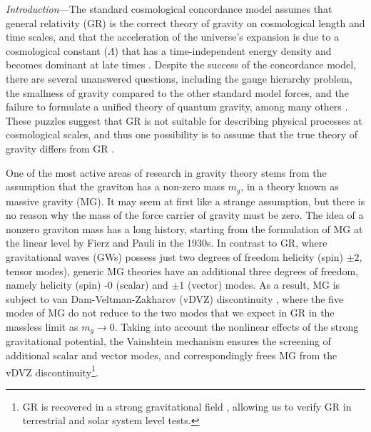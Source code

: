 \documentclass[prd,twocolumn,aps,psfig,nofootinbib,nobibnotes,superscriptaddress,preprintnumbers,times]{revtex4-2}
\begin{document}
\textit{Introduction}---The standard cosmological concordance model assumes that general relativity (GR) is the correct theory of gravity on cosmological length and time scales, and that the acceleration of the universe's expansion is due to a cosmological constant ($\Lambda$) that has a time-independent energy density and becomes dominant at late times \cite{Dodelson:2020bqr}. 
Despite the success of the concordance model, there are several unanswered questions, including the gauge hierarchy problem, the smallness of gravity compared to the other standard model forces, and the failure to formulate a unified theory of quantum gravity, among many others \cite{Dvali:2013qwe, Moffat:1998vi}. 
These puzzles suggest that GR is not suitable for describing physical processes at cosmological scales, and thus one possibility is to assume that the true theory of gravity differs from GR \cite{deRham:2023byw}. 


One of the most active areas of research in gravity theory stems from the assumption that the graviton has a non-zero mass $m_g$, in a theory known as massive gravity (MG). It may seem at first like a strange assumption, but there is no reason why the mass of the force carrier of gravity must be zero. The idea of a nonzero graviton mass has a long history, starting from the formulation of MG at the linear level by Fierz and Pauli \cite{Fierz:1939ix} in the 1930s. In contrast to GR, where gravitational waves (GWs) possess just two degrees of freedom helicity (spin) $\pm 2$, tensor modes), generic MG theories have an additional three degrees of freedom, namely helicity (spin) -$0$ (scalar) and $\pm 1$ (vector) modes. As a result, MG is subject to van Dam-Veltman-Zakharov (vDVZ) discontinuity \cite{vanDam:1970vg,Zakharov:1970cc}, where the five modes of MG do not reduce to the two modes that we expect in GR in the massless limit as $m_g \rightarrow 0$. 
Taking into account the nonlinear effects of the strong gravitational potential, the Vainshtein mechanism \cite{Vainshtein:1972sx} ensures the screening of additional scalar and vector modes, and correspondingly frees MG from the vDVZ discontinuity\footnote{GR is recovered in a strong gravitational field \cite{Tasinato:2013rza}, allowing us to verify GR in terrestrial and solar system level tests.}.
\end{document}
